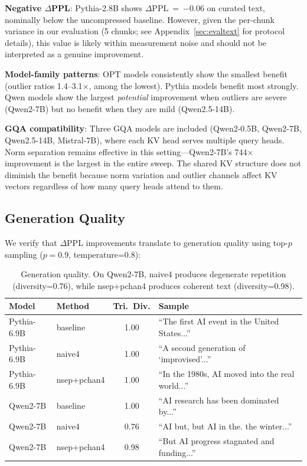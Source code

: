\documentclass[11pt]{article}
\begin{document}
\textbf{Negative $\Delta$PPL}: Pythia-2.8B shows $\Delta$PPL~=~$-$0.06 on curated text, nominally below the uncompressed baseline. However, given the per-chunk variance in our evaluation (5 chunks; see Appendix~\ref{sec:evaltext} for protocol details), this value is likely within measurement noise and should not be interpreted as a genuine improvement.

\textbf{Model-family patterns}: OPT models consistently show the smallest benefit (outlier ratios 1.4--3.1$\times$, among the lowest). Pythia models benefit most strongly. Qwen models show the largest \emph{potential} improvement when outliers are severe (Qwen2-7B) but no benefit when they are mild (Qwen2.5-14B).

\textbf{GQA compatibility}: Three GQA models are included (Qwen2-0.5B, Qwen2-7B, Qwen2.5-14B, Mistral-7B), where each KV head serves multiple query heads. Norm separation remains effective in this setting---Qwen2-7B's 744$\times$ improvement is the largest in the entire sweep. The shared KV structure does not diminish the benefit because norm variation and outlier channels affect KV vectors regardless of how many query heads attend to them.

\subsection{Generation Quality}

We verify that $\Delta$PPL improvements translate to generation quality using top-$p$ sampling ($p=0.9$, temperature=0.8):

\begin{table}[h]
\centering
\small
\begin{tabular}{llcl}
\toprule
Model & Method & Tri.\ Div. & Sample \\
\midrule
Pythia-6.9B & baseline & 1.00 & ``The first AI event in the United States...'' \\
Pythia-6.9B & naive4 & 1.00 & ``A second generation of `improvised'...'' \\
Pythia-6.9B & nsep+pchan4 & 1.00 & ``In the 1980s, AI moved into the real world...'' \\
\midrule
Qwen2-7B & baseline & 1.00 & ``AI research has been dominated by...'' \\
Qwen2-7B & naive4 & 0.76 & ``AI but, but AI in the. the winter...'' \\
Qwen2-7B & nsep+pchan4 & 0.98 & ``But AI progress stagnated and funding...'' \\
\bottomrule
\end{tabular}
\caption{Generation quality. On Qwen2-7B, naive4 produces degenerate repetition (diversity=0.76), while nsep+pchan4 produces coherent text (diversity=0.98).}
\label{tab:generation}
\end{table}
\end{document}
